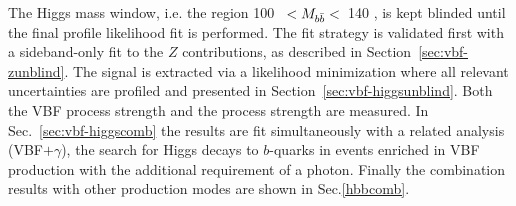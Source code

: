 The Higgs mass window, i.e. the region 100 \GeV~$< M_{b\bar{b}}<$~140 \GeV, is kept blinded until the final profile likelihood fit is performed.  The fit strategy is validated first with a sideband-only fit to the $Z$ contributions, as described in Section~\ref{sec:vbf-zunblind}. The signal is extracted via a likelihood minimization where all relevant uncertainties are profiled and presented in Section~\ref{sec:vbf-higgsunblind}. Both the VBF process strength and the \Hbb process strength are measured. In Sec.~\ref{sec:vbf-higgscomb} the results are fit simultaneously with a related analysis (VBF$+\gamma$), the search for Higgs decays to $b$-quarks in events enriched in VBF production with the additional requirement of a photon. Finally the combination results with other \Hbb production modes are shown in Sec.\ref{hbbcomb}.








